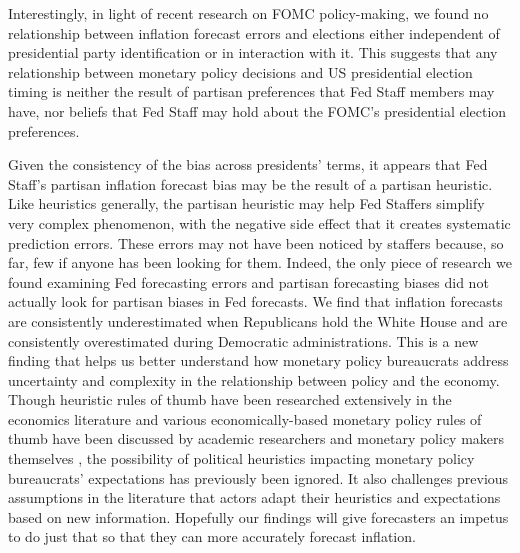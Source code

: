 \documentclass[a4paper]{article}
\begin{document}
Interestingly, in light of recent research on FOMC policy-making, we found no relationship between inflation forecast errors and elections either independent of presidential party identification or in interaction with it. This suggests that any relationship between monetary policy decisions and US presidential election timing is neither the result of partisan preferences that Fed Staff members may have, nor beliefs that Fed Staff may hold about the FOMC's presidential election preferences. 

Given the consistency of the bias across presidents' terms, it appears that Fed Staff's partisan inflation forecast bias may be the result of a partisan heuristic. Like heuristics generally, the partisan heuristic may help Fed Staffers simplify very complex phenomenon, with the negative side effect that it creates systematic prediction errors. These errors may not have been noticed by staffers because, so far, few if anyone has been looking for them. Indeed, the only piece of research we found examining Fed forecasting errors and partisan forecasting biases \cite[i.e.][]{Frendreis2000} did not actually look for partisan biases in Fed forecasts. We find that inflation forecasts are consistently underestimated when Republicans hold the White House and are consistently overestimated during Democratic administrations. This is a new finding that helps us better understand how monetary policy bureaucrats address uncertainty and complexity in the relationship between policy and the economy. Though heuristic rules of thumb have been researched extensively in the economics literature \citep[e.g.][]{kahneman1973, tverskykahneman1974, kahneman2003} and various economically-based monetary policy rules of thumb have been discussed by academic researchers and monetary policy makers themselves \cite[e.g.][]{McNees1990,Orphanides2008}, the possibility of political heuristics impacting monetary policy bureaucrats’ expectations has previously been ignored. It also challenges previous assumptions in the literature \cite[see in particular][]{Grauwe2011} that actors adapt their heuristics and expectations based on new information. Hopefully our findings will give forecasters an impetus to do just that so that they can more accurately forecast inflation.
\end{document}
